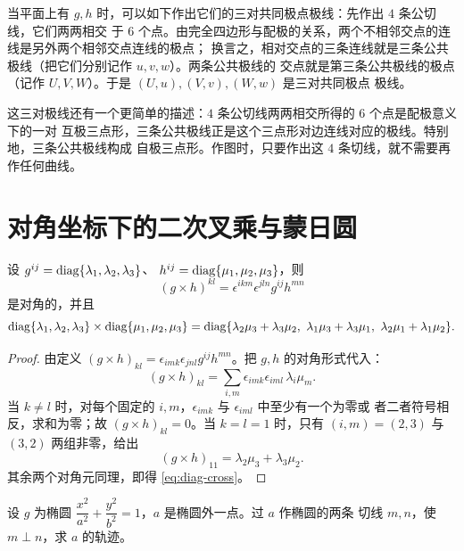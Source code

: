当平面上有 $g,h$ 时，可以如下作出它们的三对共同极点极线：先作出 $4$ 条公切线，它们两两相交
于 $6$ 个点。由完全四边形与配极的关系，两个不相邻交点的连线是另外两个相邻交点连线的极点；
换言之，相对交点的三条连线就是三条公共极线（把它们分别记作 $u,v,w$）。两条公共极线的
交点就是第三条公共极线的极点（记作 $U,V,W$）。于是 $(U,u),(V,v),(W,w)$ 是三对共同极点
极线。

这三对极线还有一个更简单的描述：$4$ 条公切线两两相交所得的 $6$ 个点是配极意义下的一对
互极三点形，三条公共极线正是这个三点形对边连线对应的极线。特别地，三条公共极线构成
自极三点形。作图时，只要作出这 $4$ 条切线，就不需要再作任何曲线。

\section{对角坐标下的二次叉乘与蒙日圆}

\begin{proposition}
\label{prop:diag-cross}
设 $g^{ij}=\operatorname{diag}\{\lambda_1,\lambda_2,\lambda_3\}$、
$h^{ij}=\operatorname{diag}\{\mu_1,\mu_2,\mu_3\}$，则
\[
(g\times h)^{kl}=\epsilon^{ikm}\epsilon^{jln}g^{ij}h^{mn}
\]
是对角的，并且
\begin{equation}
\label{eq:diag-cross}
\operatorname{diag}\{\lambda_1,\lambda_2,\lambda_3\}\times\operatorname{diag}\{\mu_1,\mu_2,\mu_3\}
=\operatorname{diag}\{\lambda_2\mu_3+\lambda_3\mu_2,\
\lambda_1\mu_3+\lambda_3\mu_1,\
\lambda_2\mu_1+\lambda_1\mu_2\}.
\end{equation}
\end{proposition}

\begin{proof}
由定义 $(g\times h)_{kl}=\epsilon_{imk}\epsilon_{jnl}g^{ij}h^{mn}$。把 $g,h$ 的对角形式代入：
\[
(g\times h)_{kl}=\sum_{i,m}\epsilon_{imk}\epsilon_{iml}\,\lambda_i\mu_m .
\]
当 $k\ne l$ 时，对每个固定的 $i,m$，$\epsilon_{imk}$ 与 $\epsilon_{iml}$ 中至少有一个为零或
者二者符号相反，求和为零；故 $(g\times h)_{kl}=0$。当 $k=l=1$ 时，只有 $(i,m)=(2,3)$ 与
$(3,2)$ 两组非零，给出
\[
(g\times h)_{11}=\lambda_2\mu_3+\lambda_3\mu_2 .
\]
其余两个对角元同理，即得 \eqref{eq:diag-cross}。
\end{proof}

\begin{example}[蒙日圆]
\label{ex:monge}
设 $g$ 为椭圆 $\dfrac{x^2}{a^2}+\dfrac{y^2}{b^2}=1$，$a$ 是椭圆外一点。过 $a$ 作椭圆的两条
切线 $m,n$，使 $m\perp n$，求 $a$ 的轨迹。
\end{example}


